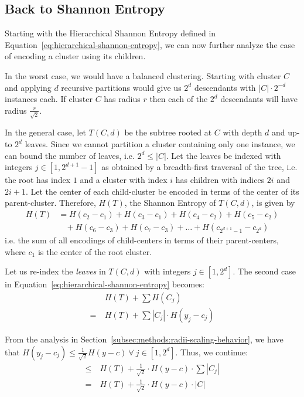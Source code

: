 \subsection{Back to Shannon Entropy}
\label{subsec:methods:back-to-shannon-entropy}

Starting with the Hierarchical Shannon Entropy defined in Equation~\ref{eq:hierarchical-shannon-entropy}, we can now further analyze the case of encoding a cluster using its children.

In the worst case, we would have a balanced clustering.
Starting with cluster $C$ and applying $d$ recursive partitions would give us $2^d$ descendants with $|C| \cdot 2^{-d}$ instances each.
If cluster $C$ has radius $r$ then each of the $2^d$ descendants will have radius $\frac{r}{\sqrt{2}}$.

In the general case, let $T(C, d)$ be the subtree rooted at $C$ with depth $d$ and up-to $2^d$ leaves.
Since we cannot partition a cluster containing only one instance, we can bound the number of leaves, i.e. $2^d \leq |C|$.
Let the leaves be indexed with integers $j \in [1, 2^{d + 1} - 1]$ as obtained by a breadth-first traversal of the tree, i.e. the root has index $1$ and a cluster with index $i$ has children with indices $2i$ and $2i + 1$.
Let the center of each child-cluster be encoded in terms of the center of its parent-cluster.
Therefore, $H(T)$, the Shannon Entropy of $T(C, d)$, is given by
\begin{align*}
    H(T) &= H(c_2 - c_1) + H(c_3 - c_1) + H(c_4 - c_2) + H(c_5 - c_2) \\
    & \ \ \ \ + H(c_6 - c_3) + H(c_7 - c_3) + \dots + H(c_{2^{d + 1} - 1} - c_{2^d})
\end{align*}
i.e. the sum of all encodings of child-centers in terms of their parent-centers, where $c_1$ is the center of the root cluster.

Let us re-index the \textit{leaves} in $T(C, d)$ with integers $j \in [1, 2^d]$.
The second case in Equation~\ref{eq:hierarchical-shannon-entropy} becomes:
\begin{align*}
    & H(T) + \sum H(C_j) \\
    = \ & H(T) + \sum |C_j| \cdot H(y_j - c_j)
\end{align*}

From the analysis in Section~\ref{subsec:methods:radii-scaling-behavior}, we have that $H(y_j - c_j) \leq \frac{1}{\sqrt{2}} H(y - c) \ \forall \ j \in [1, 2^d]$.
Thus, we continue:
\begin{align*}
    \leq \ & H(T) + \frac{1}{\sqrt{2}} \cdot H(y - c) \cdot \sum |C_j| \\
    = \ & H(T) + \frac{1}{\sqrt{2}} \cdot H(y - c) \cdot |C|
\end{align*}

